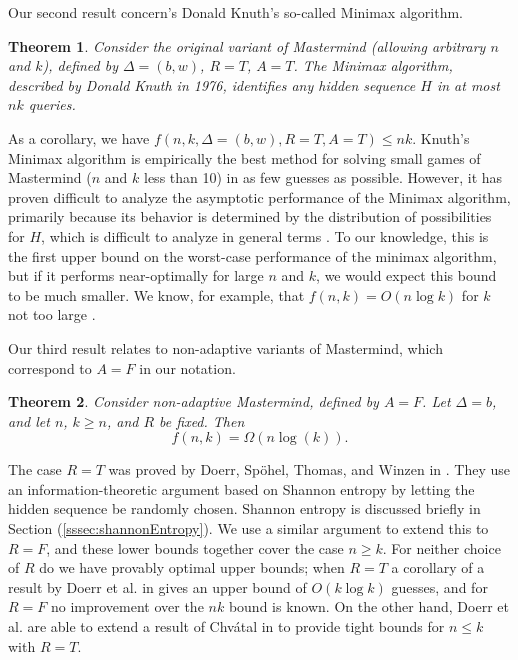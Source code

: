 \documentclass[12pt, a4paper]{article}
\newtheorem{theorem}{Theorem}
\begin{document}
Our second result concern's Donald Knuth's so-called Minimax algorithm.
\begin{theorem}\label{minimaxTheorem}
	Consider the original variant of Mastermind (allowing arbitrary $n$ and $k$), defined by $\Delta=(b, w)$, $R=T$, $A=T$. The Minimax algorithm, described by Donald Knuth in 1976, identifies any hidden sequence $H$ in at most $nk$ queries.
\end{theorem}
As a corollary, we have $f(n, k, \Delta=(b,w), R=T, A=T)\le nk$. Knuth's Minimax algorithm is empirically the best method for solving small games of Mastermind ($n$ and $k$ less than 10) in as few guesses as possible. However, it has proven difficult to analyze the asymptotic performance of the Minimax algorithm, primarily because its behavior is determined by the distribution of possibilities for $H$, which is difficult to analyze in general terms \cite{KT86, OS13}. To our knowledge, this is the first upper bound on the worst-case performance of the minimax algorithm, but if it performs near-optimally for large $n$ and $k$, we would expect this bound to be much smaller. We know, for example, that $f(n,k) = O(n \log k)$ for $k$ not too large \cite{DK76, KT86}.

Our third result relates to non-adaptive variants of Mastermind, which correspond to $A=F$ in our notation.
\begin{theorem}\label{nonAdaptiveTheorem}
Consider non-adaptive Mastermind, defined by $A=F$. Let $\Delta = b$, and let $n$, $k \ge n$, and $R$ be fixed. Then
	\begin{equation*}
		f(n, k) = \Omega\left( n\log(k)\right).
	\end{equation*}
\end{theorem}
The case $R = T$ was proved by Doerr, Sp\"ohel, Thomas, and Winzen in \cite{DS13}. They use an information-theoretic argument based on Shannon entropy by letting the hidden sequence be randomly chosen. Shannon entropy is discussed briefly in Section (\ref{sssec:shannonEntropy}).
We use a similar argument to extend this to $R = F$, and
these lower bounds together cover the case $n \geq k$. For neither choice of $R$ do we have provably optimal upper bounds; when $R = T$ a corollary of a result by Doerr et al. in \cite{DS13} gives an upper bound of $O(k \log k)$ guesses, and for $R = F$ no improvement over the $nk$ bound is known. On the other hand, Doerr et al. are able to extend a result of Chv\'atal in \cite{VC83} to provide tight bounds for $n \le k$ with $R = T$.
\end{document}

